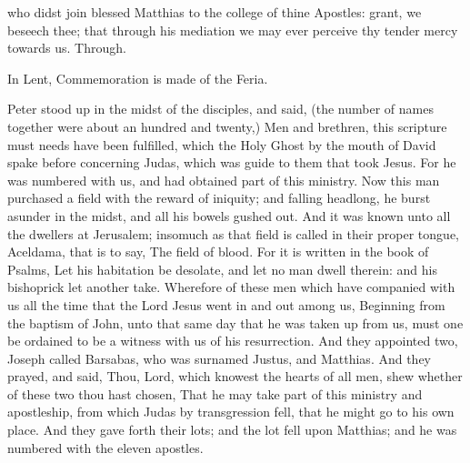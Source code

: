 \collect
 who didst join blessed Matthias to the college of thine Apostles: grant, we beseech thee; that through his mediation we may ever perceive thy tender mercy towards us. Through.
\begin{rubric}
    In Lent, Commemoration is made of the Feria.%
\end{rubric}
 Peter stood up in the midst of the disciples, and said, (the number of names together were about an hundred and twenty,) Men and brethren, this scripture must needs have been fulfilled, which the Holy Ghost by the mouth of David spake before concerning Judas, which was guide to them that took Jesus. For he was numbered with us, and had obtained part of this ministry. Now this man purchased a field with the reward of iniquity; and falling headlong, he burst asunder in the midst, and all his bowels gushed out. And it was known unto all the dwellers at Jerusalem; insomuch as that field is called in their proper tongue, Aceldama, that is to say, The field of blood. For it is written in the book of Psalms, Let his habitation be desolate, and let no man dwell therein: and his bishoprick let another take. Wherefore of these men which have companied with us all the time that the Lord Jesus went in and out among us, Beginning from the baptism of John, unto that same day that he was taken up from us, must one be ordained to be a witness with us of his resurrection. And they appointed two, Joseph called Barsabas, who was surnamed Justus, and Matthias. And they prayed, and said, Thou, Lord, which knowest the hearts of all men, shew whether of these two thou hast chosen, That he may take part of this ministry and apostleship, from which Judas by transgression fell, that he might go to his own place. And they gave forth their lots; and the lot fell upon Matthias; and he was numbered with the eleven apostles.


